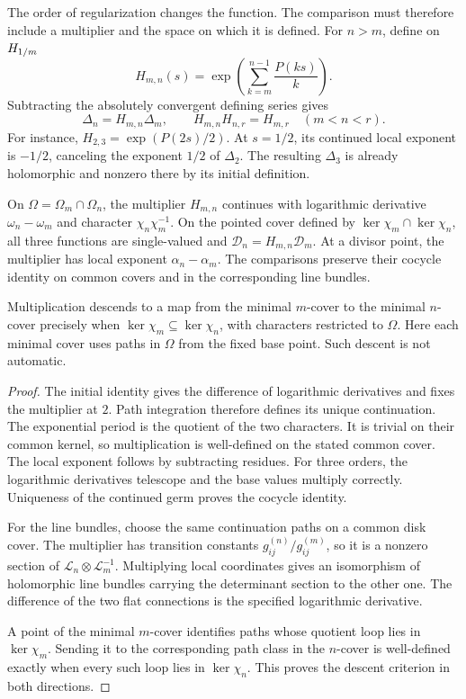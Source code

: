 The order of regularization changes the function.  The comparison must
therefore include a multiplier and the space on which it is defined.
For \(n>m\), define on \(H_{1/m}\)
\[
 H_{m,n}(s)=\exp\left(\sum_{k=m}^{n-1}\frac{P(ks)}k\right).
\]
Subtracting the absolutely convergent defining series gives
\[
 \Delta_n=H_{m,n}\Delta_m,\qquad
 H_{m,n}H_{n,r}=H_{m,r}\quad(m<n<r).
\]
For instance, \(H_{2,3}=\exp(P(2s)/2)\).
At \(s=1/2\), its continued local exponent is \(-1/2\), canceling
the exponent \(1/2\) of \(\Delta_2\).  The resulting \(\Delta_3\)
is already holomorphic and nonzero there by its initial definition.

\begin{theorem}
\label{thm:order-comparison}
On \(\Omega=\Omega_m\cap\Omega_n\), the multiplier \(H_{m,n}\)
continues with logarithmic derivative \(\omega_n-\omega_m\) and
character \(\chi_n\chi_m^{-1}\).  On the pointed cover defined by
\(\ker\chi_m\cap\ker\chi_n\), all three functions are single-valued
and \(\mathcal D_n=H_{m,n}\mathcal D_m\).
At a divisor point, the multiplier has local exponent
\(\alpha_n-\alpha_m\).  The comparisons preserve their cocycle identity
on common covers and in the corresponding line bundles.

Multiplication descends to a map from the minimal \(m\)-cover to the
minimal \(n\)-cover precisely when
\(\ker\chi_m\subseteq\ker\chi_n\), with characters restricted to
\(\Omega\).  Here each minimal cover uses paths in \(\Omega\) from
the fixed base point.  Such descent is not automatic.
\end{theorem}

\begin{proof}
The initial identity gives the difference of logarithmic derivatives and
fixes the multiplier at \(2\).  Path integration therefore defines its
unique continuation.  The exponential period is the quotient of the two
characters.  It is trivial on their common kernel, so multiplication is
well-defined on the stated common cover.  The local exponent follows by
subtracting residues.  For three orders, the logarithmic derivatives
telescope and the base values multiply correctly.  Uniqueness of the
continued germ proves the cocycle identity.

For the line bundles, choose the same continuation paths on a common disk
cover.  The multiplier has transition constants
\(g_{ij}^{(n)}/g_{ij}^{(m)}\), so it is a nonzero section of
\(\mathcal L_n\otimes\mathcal L_m^{-1}\).
Multiplying local coordinates gives an isomorphism of holomorphic line
bundles carrying the determinant section to the other one.  The difference
of the two flat connections is the specified logarithmic derivative.

A point of the minimal \(m\)-cover identifies paths whose quotient loop
lies in \(\ker\chi_m\).  Sending it to the corresponding path class
in the \(n\)-cover is well-defined exactly when every such loop lies
in \(\ker\chi_n\).  This proves the descent criterion in both directions.
\end{proof}

